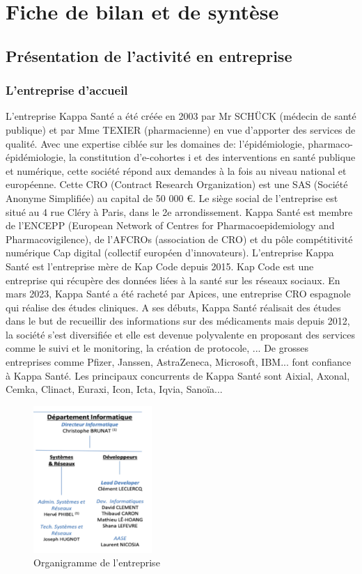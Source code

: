 \section{Fiche de bilan et de syntèse}
\subsection{Présentation de l'activité en entreprise}
\subsubsection{L'entreprise d'accueil}
L’entreprise Kappa Santé a été créée en 2003 par Mr SCHÜCK (médecin de
santé publique) et par Mme TEXIER (pharmacienne) en vue d’apporter des
services de qualité. Avec une expertise ciblée sur les domaines de:
l’épidémiologie, pharmaco- épidémiologie, la constitution d’e-cohortes i et des
interventions en santé publique et numérique, cette société répond aux
demandes à la fois au niveau national et européenne.
Cette CRO (Contract Research Organization) est une SAS (Société Anonyme
Simplifiée) au capital de 50 000 €.
Le siège social de l’entreprise est situé au 4 rue Cléry à Paris, dans le 2e
arrondissement.
Kappa Santé est membre de l’ENCEPP (European Network of Centres for
Pharmacoepidemiology and Pharmacovigilence), de l’AFCROs (association de
CRO) et du pôle compétitivité numérique Cap digital (collectif européen
d’innovateurs).
L’entreprise Kappa Santé est l’entreprise mère de Kap Code depuis 2015. Kap
Code est une entreprise qui récupère des données liées à la santé sur les
réseaux sociaux.
En mars 2023, Kappa Santé a été racheté par Apices, une entreprise CRO
espagnole qui réalise des études cliniques.
A ses débuts, Kappa Santé réalisait des études dans le but de recueillir des
informations sur des médicaments mais depuis 2012, la société s’est diversifiée
et elle est devenue polyvalente en proposant des services comme le suivi et le
monitoring, la création de protocole, ...
De grosses entreprises comme Pfizer, Janssen, AstraZeneca, Microsoft, IBM... font confiance à Kappa Santé. Les principaux concurrents de Kappa Santé sont
Aixial, Axonal, Cemka, Clinact, Euraxi, Icon, Icta, Iqvia, Sanoïa...
\begin{figure}[ht]
    \centering
    \includegraphics[width=0.4\textwidth]{fiche_bilan/fiche_bilan_images/organigramme_info.png} 
    \caption{Organigramme de l'entreprise}
\end{figure}
